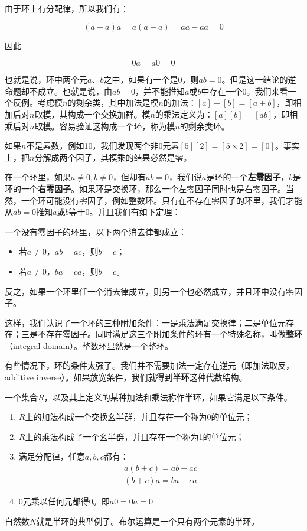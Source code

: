 \documentclass[b5paper]{ctexart}
\begin{document}
由于环上有分配律，所以我们有：

\[
(a - a)a = a(a - a) = aa - aa = 0
\]

因此

\[
0 a = a 0 = 0
\]

也就是说，环中两个元$a$、$b$之中，如果有一个是0，则$ab = 0$。但是这一结论的逆命题却不成立。也就是说，由$ab = 0$，并不能推知$a$或$b$中存在一个0。我们来看一个反例。考虑模$n$的剩余类，其中加法是模$n$的加法：$[a] + [b] = [a + b]$，即相加后对$n$取模，其构成一个交换加群。模$n$的乘法定义为：$[a][b] = [ab]$，即相乘后对$n$取模。容易验证这构成一个环，称为模$n$的剩余类环。

如果$n$不是素数，例如10，我们发现两个非0元素$[5][2] = [5 \times 2] = [0]$。事实上，把$n$分解成两个因子，其模乘的结果必然是零。

在一个环里，如果$a \neq 0, b \neq 0$，但却有$ab = 0$，我们说$a$是环的一个\textbf{左零因子}，$b$是环的一个\textbf{右零因子}。如果环是交换环，那么一个左零因子同时也是右零因子。当然，一个环可能没有零因子，例如整数环。只有在不存在零因子的环里，我们才能从$ab = 0$推知$a$或$b$等于0。并且我们有如下定理：

\begin{theorem}
一个没有零因子的环里，以下两个消去律都成立：
\begin{itemize}
\item 若$a \neq 0$，$ab = ac$，则$b = c$；
\item 若$a \neq 0$，$ba = ca$，则$b = c$。
\end{itemize}
\end{theorem}

反之，如果一个环里任一个消去律成立，则另一个也必然成立，并且环中没有零因子。

这样，我们认识了一个环的三种附加条件：一是乘法满足交换律；二是单位元存在；三是不存在零因子。同时满足这三个附加条件的环有一个特殊名称，叫做\textbf{整环}（integral domain）。整数环显然是一个整环。

有些情况下，环的条件太强了。我们并不需要加法一定存在逆元（即加法取反，additive inverse）。如果放宽条件，我们就得到\textbf{半环}这种代数结构。

\begin{definition}
一个集合$R$，以及其上定义的某种加法和乘法称作半环，如果它满足以下条件。
\begin{enumerate}
\item $R$上的加法构成一个交换幺半群，并且存在一个称为0的单位元；
\item $R$上的乘法构成了一个幺半群，并且存在一个称为1的单位元；
\item 满足分配律，任意$a, b, c$都有：
\[
\begin{array}{l}
a(b + c) = ab + ac \\
(b + c)a = ba + ca
\end{array}
\]
\item 0元乘以任何元都得0。即$a0 = 0a = 0$
\end{enumerate}
\end{definition}
自然数$N$就是半环的典型例子。布尔运算是一个只有两个元素的半环。
\end{document}
